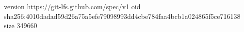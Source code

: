 version https://git-lfs.github.com/spec/v1
oid sha256:4010dadad59d26a75a5efe79098993dd4cbe784faa4bcb1a024865f5ce716138
size 349660
